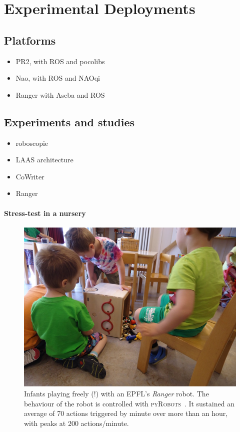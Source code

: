 \documentclass[a4paper, 10pt, conference]{ieeeconf}      %
\newcommand{\pyRobots}{\textsc{pyRobots}\ }
\begin{document}
\section{Experimental Deployments}

\subsection{Platforms}

\begin{itemize}
    \item PR2, with ROS and pocolibs
    \item Nao, with ROS and NAOqi
    \item Ranger with Aseba and ROS
\end{itemize}

\subsection{Experiments and studies}

\begin{itemize}
    \item roboscopie
    \item LAAS architecture
    \item CoWriter
    \item Ranger
\end{itemize}

\paragraph{Stress-test in a nursery}

\begin{figure}
        \centering
        \includegraphics[width=0.9\columnwidth]{ranger-side}
        \caption{Infants playing freely (!) with an EPFL's \emph{Ranger} robot.
        The behaviour of the robot is controlled with \pyRobots. It sustained an
        average of 70 actions triggered by minute over more than an hour,
        with peaks at 200 actions/minute.}
        \label{expe-nursery}
\end{figure}
\end{document}
